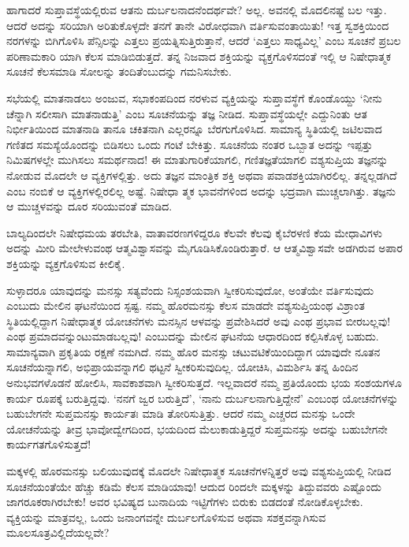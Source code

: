 ಹಾಗಾದರೆ ಸುಪ್ತಾವಸ್ಥೆಯಲ್ಲಿರುವ ಆತನು ದುರ್ಬಲನಾದನೆಂದರ್ಥವೇ? ಅಲ್ಲ. ಅವನಲ್ಲಿ ಮೊದಲಿನಷ್ಟೆ ಬಲ ಇತ್ತು. ಆದರೆ ಅದನ್ನು ಸರಿಯಾಗಿ ಅರಿತುಕೊಳ್ಳದೇ ತನಗೆ ತಾನೇ ವಿರೋಧವಾಗಿ ವರ್ತಿಸುವಂತಾಯಿತು! ಇತ್ತ ಸ್ವಶಕ್ತಿಯಿಂದ ನರಗಳನ್ನು ಬಿಗಿಗೊಳಿಸಿ ಪೆನ್ಸಿಲನ್ನು ಎತ್ತಲು ಪ್ರಯತ್ನಿಸುತ್ತಿರುತ್ತಾನೆ, ಆದರೆ ‘ಎತ್ತಲು ಸಾಧ್ಯವಿಲ್ಲ’ ಎಂಬ ಸೂಚನೆ ಪ್ರಬಲ ಪರಿಣಾಮಕಾರಿ ಯಾಗಿ ಕೆಲಸ ಮಾಡಿಬಿಡುತ್ತದೆ. ತನ್ನ ನಿಜವಾದ ಶಕ್ತಿಯನ್ನು ವ್ಯಕ್ತಗೊಳಿಸದಂತೆ ಇಲ್ಲಿ ಆ ನಿಷೇಧಾತ್ಮಕ ಸೂಚನೆ ಕೆಲಸಮಾಡಿ ಸೋಲನ್ನು ತಂದಿತೆಂಬುದನ್ನು ಗಮನಿಸಬೇಕು.

ಸಭೆಯಲ್ಲಿ ಮಾತನಾಡಲು ಅಂಜುವ, ಸಭಾಕಂಪದಿಂದ ನರಳುವ ವ್ಯಕ್ತಿಯನ್ನು ಸುಪ್ತಾವಸ್ಥೆಗೆ ಕೊಂಡೊಯ್ದು ‘ನೀನು ಚೆನ್ನಾಗಿ ಸಲೀಸಾಗಿ ಮಾತನಾಡುತ್ತಿ’ ಎಂಬ ಸೂಚನೆಯನ್ನು ತಜ್ಞ ನೀಡಿದ. ಸುಪ್ತಾವಸ್ಥೆಯಲ್ಲೇ ಎದ್ದುನಿಂತು ಆತ ನಿರ್ಭೀತಿಯಿಂದ ಮಾತನಾಡಿ ತಾನೂ ಚಕಿತನಾಗಿ ಎಲ್ಲರನ್ನೂ ಬೆರಗುಗೊಳಿಸಿದ. ಸಾಮಾನ್ಯ ಸ್ಥಿತಿಯಲ್ಲಿ ಜಟಿಲವಾದ ಗಣಿತದ ಸಮಸ್ಯೆಯೊಂದನ್ನು ಬಿಡಿಸಲು ಒಂದು ಗಂಟೆ ಬೇಕಿತ್ತು. ಸೂಚನೆಯ ನಂತರ ಒಬ್ಬಾತ ಅದನ್ನು ಇಪ್ಪತ್ತು ನಿಮಿಷಗಳಲ್ಲೇ ಮುಗಿಸಲು ಸಮರ್ಥನಾದ! ಈ ಮಾತುಗಾರಿಕೆಯಾಗಲಿ, ಗಣಿತಜ್ಞತೆಯಾಗಲಿ ವಶ್ಯಸುಪ್ತಿಯ ತಜ್ಞನನ್ನು ನೋಡುವ ಮೊದಲೇ ಆ ವ್ಯಕ್ತಿಗಳಲ್ಲಿತ್ತು. ಅದು ತಜ್ಞನ ಮಾಂತ್ರಿಕ ಶಕ್ತಿ ಅಥವಾ ಪವಾಡಶಕ್ತಿಯಾಗಿರಲಿಲ್ಲ. ತನ್ನಲ್ಲಡಗಿದೆ ಎಂಬ ನಂಬಿಕೆ ಆ ವ್ಯಕ್ತಿಗಳಲ್ಲಿರಲಿಲ್ಲ ಅಷ್ಟೆ. ನಿಷೇಧಾ ತ್ಮಕ ಭಾವನೆಗಳಿಂದ ಅದನ್ನು ಭದ್ರವಾಗಿ ಮುಚ್ಚಲಾಗಿತ್ತು. ತಜ್ಞನು ಆ ಮುಚ್ಚಳವನ್ನು ದೂರ ಸರಿಯುವಂತೆ ಮಾಡಿದ.

\newpage

ಬಾಲ್ಯದಿಂದಲೇ ನಿಷೇಧಮಯ ತರಬೇತಿ, ವಾತಾವರಣಗಳಿದ್ದರೂ ಕೆಲವೇ ಕೆಲವು ಕೈಬೆರಳಣಿ ಕೆಯ ಮೇಧಾವಿಗಳು ಅದನ್ನು ಮೀರಿ ಮೇಲೇಳುವಂಥ ಆತ್ಮವಿಶ್ವಾಸವನ್ನು ಮೈಗೂಡಿಸಿ\-ಕೊಂಡಿರು\-ತ್ತಾರೆ. ಆ ಆತ್ಮವಿಶ್ವಾಸವೇ ಅಡಗಿರುವ ಅಪಾರ ಶಕ್ತಿಯನ್ನು ವ್ಯಕ್ತಗೊಳಿಸುವ ಕೀಲಿಕೈ.

ಸುಳ್ಳಾದರೂ ಯಾವುದನ್ನು ಮನಸ್ಸು ಸತ್ಯವೆಂದು ನಿಸ್ಸಂಶಯವಾಗಿ ಸ್ವೀಕರಿಸುವುದೋ, ಅಂತೆಯೇ ವರ್ತಿಸುವುದು ಎಂಬುದು ಮೇಲಿನ ಘಟನೆಯಿಂದ ಸ್ಪಷ್ಟ. ನಮ್ಮ ಹೊರಮನಸ್ಸು ಕೆಲಸ ಮಾಡದೇ ವಶ್ಯಸುಪ್ತಿಯಂಥ ವಿಶ್ರಾಂತ ಸ್ಥಿತಿಯಲ್ಲಿದ್ದಾಗ ನಿಷೇಧಾತ್ಮಕ ಯೋಚನೆಗಳು ಮನಸ್ಸಿನ ಆಳವನ್ನು ಪ್ರವೇಶಿಸಿದರೆ ಅವು ಎಂಥ ಪ್ರಭಾವ ಬೀರಬಲ್ಲವು! ಎಂಥ ಪ್ರಮಾದ\-ವನ್ನುಂಟು\-ಮಾಡ\-ಬಲ್ಲವು! ಎಂಬುದನ್ನು ಮೇಲಿನ ಘಟನೆಯ ಆಧಾರದಿಂದ ಕಲ್ಪಿಸಿಕೊಳ್ಳ ಬಹುದು. ಸಾಮಾನ್ಯವಾಗಿ ಪ್ರಕೃತಿಯ ರಕ್ಷಣೆ ನಮಗಿದೆ. ನಮ್ಮ ಹೊರ ಮನಸ್ಸು ಚಟುವಟಿಕೆಯಿಂದಿದ್ದಾಗ ಯಾವುದೇ ನೂತನ ಸೂಚನೆಯನ್ನಾಗಲಿ, ಅಭಿಪ್ರಾಯವನ್ನಾಗಲಿ ಥಟ್ಟನೆ ಸ್ವೀಕರಿಸುವುದಿಲ್ಲ. ಯೋಚಿಸಿ, ವಿಮರ್ಶಿಸಿ ತನ್ನ ಹಿಂದಿನ ಅನುಭವಗಳೊಡನೆ ಹೋಲಿಸಿ, ಸಾವಕಾಶವಾಗಿ ಸ್ವೀಕರಿಸುತ್ತದೆ. ಇಲ್ಲವಾದರೆ ನಮ್ಮ ಪ್ರತಿಯೊಂದು ಭಯ ಸಂಶಯಗಳೂ ಕಾರ್ಯ ರೂಪಕ್ಕೆ ಬರುತ್ತಿದ್ದವು. ‘ನನಗೆ ಜ್ವರ ಬರುತ್ತಿದೆ’, ‘ನಾನು ದುರ್ಬಲನಾಗುತ್ತಿದ್ದೇನೆ’ ಎಂಬಂಥ ಯೋಚನೆಗಳನ್ನು ಬಹುಬೇಗನೇ ಸುಪ್ತಮನಸ್ಸು ಕಾರ್ಯತಃ ಮಾಡಿ ತೋರಿಸುತ್ತಿತ್ತು. ಆದರೆ ನಮ್ಮ ಎಚ್ಚರದ ಮನಸ್ಸು ಒಂದೇ ಯೋಚನೆಯನ್ನು ತೀವ್ರ ಭಾವೋದ್ವೇಗದಿಂದ, ಭಯದಿಂದ ಮೆಲುಕಾಡುತ್ತಿದ್ದರೆ ಸುಪ್ತಮನಸ್ಸು ಅದನ್ನು ಬಹುಬೇಗನೇ ಕಾರ್ಯಗತಗೊಳಿಸುತ್ತದೆ!

ಮಕ್ಕಳಲ್ಲಿ ಹೊರಮನಸ್ಸು ಬಲಿಯುವುದಕ್ಕೆ ಮೊದಲೇ ನಿಷೇಧಾತ್ಮಕ ಸೂಚನೆಗಳನ್ನಿತ್ತರೆ ಅವು ವಶ್ಯಸುಪ್ತಿಯಲ್ಲಿ ನೀಡಿದ ಸೂಚನೆಯಂತೆಯೇ ಹೆಚ್ಚು ಕಡಿಮೆ ಕೆಲಸ ಮಾಡಿಯಾವು! ಆದುದ ರಿಂದಲೇ ಮಕ್ಕಳನ್ನು ತಿದ್ದುವವರು ಎಷ್ಟೊಂದು ಜಾಗರೂಕರಾಗಿರಬೇಕು! ಅವರ ಭವಿಷ್ಯದ ಬುನಾದಿಯ ಇಟ್ಟಿಗೆಗಳು ಬಿರುಕು ಬಿಡದಂತೆ ನೋಡಿಕೊಳ್ಳಬೇಕು. ವ್ಯಕ್ತಿಯನ್ನು ಮಾತ್ರವಲ್ಲ, ಒಂದು ಜನಾಂಗವನ್ನೇ ದುರ್ಬಲಗೊಳಿಸುವ ಅಥವಾ ಸಶಕ್ತವನ್ನಾಗಿಸುವ ಮೂಲಸೂತ್ರವಿಲ್ಲಿದೆಯಲ್ಲವೇ?

